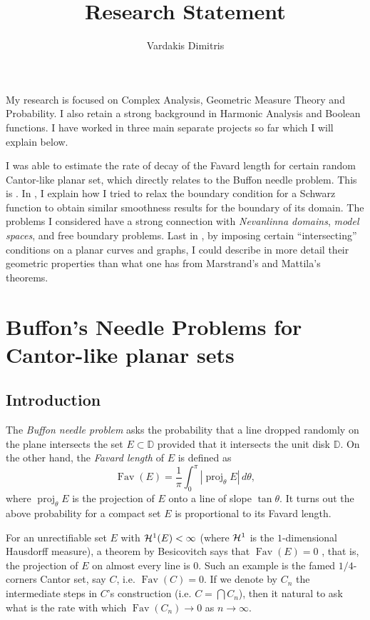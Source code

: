 \documentclass[11pt]{amsart} %
\title{Research Statement}
\author{Vardakis Dimitris}
\theoremstyle{remark} %
\theoremstyle{definition} %
\numberwithin{equation}{section} %
\def \D{{\mathbb{D}}}	\def \J{{\mathbb{J}}}	\def \P{{\mathbb{P}}}	\def \V{{\mathbb{V}}}
\newcommand{\0}[1]{\overline{#1}} %
\newcommand{\1}[1]{\tilde{#1}} %
\newcommand{\2}[1]{{}_{|#1}} %
\DeclareMathOperator{\proj}{proj} %
\DeclareMathOperator{\Fav}{Fav} %
\begin{document}
\maketitle

My research is focused on Complex Analysis, Geometric Measure Theory and Probability. I also retain a strong background in Harmonic Analysis and Boolean functions. I have worked in three main separate projects so far which I will explain below.

I was able to estimate the rate of decay of the Favard length for certain random Cantor-like planar set, which directly relates to the Buffon needle problem. This is . In , I explain how I tried to relax the boundary condition for a Schwarz function to obtain similar smoothness results for the boundary of its domain. The problems I considered have a strong connection with \emph{Nevanlinna domains}, \emph{model spaces}, and free boundary problems. Last in , by imposing certain ``intersecting'' conditions on a planar curves and graphs, I could describe in more detail their geometric properties than what one has from Marstrand's and Mattila's theorems.


\section{Buffon's Needle Problems for Cantor-like planar sets}	\label{sec:Buffon}

\subsection*{Introduction}
The \emph{Buffon needle problem} asks the probability that a line dropped randomly on the plane intersects the set $E\subset\D$ provided that it intersects the unit disk $\D$. On the other hand, the \emph{Favard length} of $E$ is defined as
\[\Fav(E)=\frac{1}{π}\int_0^π|\proj_θE|\,dθ,\]
where $\proj_θE$ is the projection of $E$ onto a line of slope $\tan θ$. It turns out the above probability for a compact set $E$ is proportional to its Favard length.

For an unrectifiable set $E$ with ${\mathcal{H}}^1(E)<\infty$ (where ${\mathcal{H}}^1$ is the $1$-dimensional Hausdorff measure), a theorem by Besicovitch says that $\Fav(E)=0$ \cite{Mat1975}, that is, the projection of $E$ on almost every line is $0$. Such an example is the famed $1/4$-corners Cantor set, say $C$, i.e. $\Fav(C)=0$. If we denote by $C_n$ the intermediate steps in $C$'s construction (i.e. $C=\bigcap C_n$), then it natural to ask what is the rate with which $\Fav(C_n)\to 0$ as $n\to\infty$.
\end{document}
